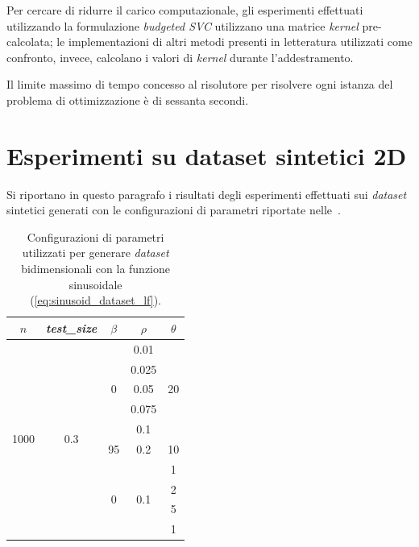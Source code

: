 Per cercare di ridurre il carico computazionale, gli esperimenti effettuati utilizzando la formulazione \emph{budgeted SVC} utilizzano una matrice \emph{kernel} pre-calcolata; le implementazioni di altri metodi presenti in letteratura utilizzati come confronto, invece, calcolano i valori di \emph{kernel} durante l'addestramento.

Il limite massimo di tempo concesso al risolutore per risolvere ogni istanza del problema di ottimizzazione è di sessanta secondi.

\section{Esperimenti su dataset sintetici 2D}\label{sec:exp:synth_2d}
Si riportano in questo paragrafo i risultati degli esperimenti effettuati sui \emph{dataset} sintetici generati con le configurazioni di parametri riportate nelle~.
\begin{table}
    \centering
    \begin{tabular}{ccccc}
        \toprule
         $n$ & \emph{test\_size} & $\beta$ & $\rho$ & $\theta$ \\
        \midrule
        \multirow{10}{*}{1000} & \multirow{10}{*}{0.3} &\multirow{5}{*}{0}  & 0.01  & \multirow{5}{*}{20} \\        
                            &&& 0.025 &     \\        
                            &&& 0.05  &     \\        
                            &&& 0.075 &     \\        
                            &&& 0.1   &     \\
        \cline{3-5}
                &&  95      & 0.2   & 10    \\   
        \cline{3-5}
        &&  \multirow{4}{*}{0}  & \multirow{4}{*}{0.1}  & 1     \\    
                            &&&                       & 2     \\    
                            &&&                       & 5     \\    
                            &&&                       & 1     \\    
        \bottomrule
    \end{tabular}
    \caption{Configurazioni di parametri utilizzati per generare \emph{dataset} bidimensionali con la funzione sinusoidale (\ref{eq:sinusoid_dataset_lf}).}
    \label{tab:parametri_ds_sin}
\end{table}
